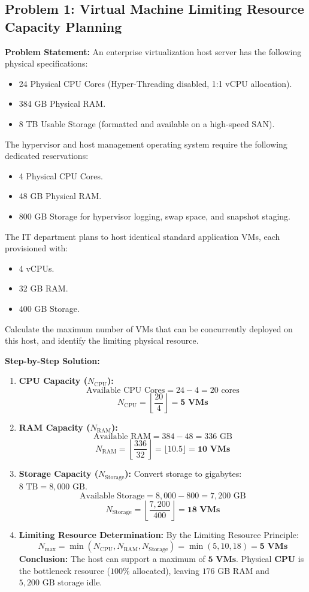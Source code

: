 \subsection*{Problem 1: Virtual Machine Limiting Resource Capacity Planning}
\textbf{Problem Statement:} An enterprise virtualization host server has the following physical specifications:
\begin{itemize}
    \item 24 Physical CPU Cores (Hyper-Threading disabled, 1:1 vCPU allocation).
    \item 384 GB Physical RAM.
    \item 8 TB Usable Storage (formatted and available on a high-speed SAN).
\end{itemize}
The hypervisor and host management operating system require the following dedicated reservations:
\begin{itemize}
    \item 4 Physical CPU Cores.
    \item 48 GB Physical RAM.
    \item 800 GB Storage for hypervisor logging, swap space, and snapshot staging.
\end{itemize}
The IT department plans to host identical standard application VMs, each provisioned with:
\begin{itemize}
    \item 4 vCPUs.
    \item 32 GB RAM.
    \item 400 GB Storage.
\end{itemize}
Calculate the maximum number of VMs that can be concurrently deployed on this host, and identify the limiting physical resource.

\textbf{Step-by-Step Solution:}
\begin{enumerate}[label=\arabic*.]
    \item \textbf{CPU Capacity ($N_{\text{CPU}}$):}
    \[
    \text{Available CPU Cores} = 24 - 4 = 20 \text{ cores}
    \]
    \[
    N_{\text{CPU}} = \left\lfloor \frac{20}{4} \right\rfloor = \mathbf{5\text{ VMs}}
    \]
    \item \textbf{RAM Capacity ($N_{\text{RAM}}$):}
    \[
    \text{Available RAM} = 384 - 48 = 336 \text{ GB}
    \]
    \[
    N_{\text{RAM}} = \left\lfloor \frac{336}{32} \right\rfloor = \lfloor 10.5 \rfloor = \mathbf{10\text{ VMs}}
    \]
    \item \textbf{Storage Capacity ($N_{\text{Storage}}$):}
    Convert storage to gigabytes: $8\text{ TB} = 8,000\text{ GB}$.
    \[
    \text{Available Storage} = 8,000 - 800 = 7,200 \text{ GB}
    \]
    \[
    N_{\text{Storage}} = \left\lfloor \frac{7,200}{400} \right\rfloor = \mathbf{18\text{ VMs}}
    \]
    \item \textbf{Limiting Resource Determination:}
    By the Limiting Resource Principle:
    \[
    N_{\max} = \min(N_{\text{CPU}}, N_{\text{RAM}}, N_{\text{Storage}}) = \min(5, 10, 18) = \mathbf{5\text{ VMs}}
    \]
    \textbf{Conclusion:} The host can support a maximum of $\mathbf{5\text{ VMs}}$. Physical \textbf{CPU} is the bottleneck resource ($100\%$ allocated), leaving $176\text{ GB RAM}$ and $5,200\text{ GB storage}$ idle.
\end{enumerate}

